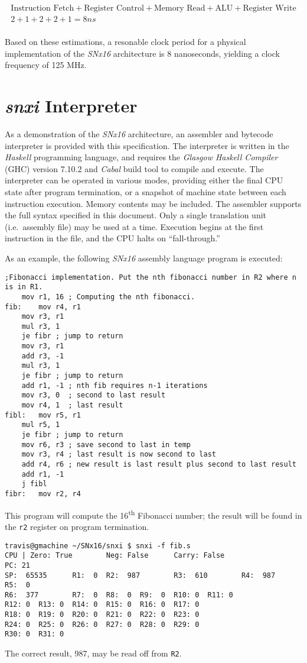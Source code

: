 \documentclass{article}
\begin{document}
\begin{gather*}
\text{Instruction Fetch} + \text{Register Control} + \text{Memory Read} + \text{ALU} + \text{Register Write} \\
2 + 1 + 2 + 2 + 1 = 8 ns \\
\end{gather*}

Based on these estimations, a resonable clock period for a physical
implementation of the \emph{SNx16} architecture is 8 nanoseconds, yielding a
clock frequency of 125 MHz.

\section{\emph{snxi} Interpreter}

As a demonstration of the \emph{SNx16} architecture, an assembler and bytecode
interpreter is provided with this specification. The interpreter is written in
the \emph{Haskell} programming language, and requires the
\emph{Glasgow Haskell Compiler} (GHC) version 7.10.2 and \emph{Cabal} build tool
to compile and execute. The interpreter can be operated in various modes,
providing either the final CPU state after program termination, or a snapshot of
machine state between each instruction execution. Memory contents may be
included. The assembler supports the full syntax specified in this document.
Only a single translation unit (i.e.\ assembly file) may be used at a time.
Execution begins at the first instruction in the file, and the CPU halts on
``fall-through.''

As an example, the following \emph{SNx16} assembly language program is executed:

\begin{lstlisting}
;Fibonacci implementation. Put the nth fibonacci number in R2 where n is in R1.
	mov r1, 16 ; Computing the nth fibonacci.
fib:	mov r4, r1
	mov r3, r1
	mul r3, 1
	je fibr ; jump to return
	mov r3, r1
	add r3, -1
	mul r3, 1
	je fibr ; jump to return
	add r1, -1 ; nth fib requires n-1 iterations
	mov r3, 0  ; second to last result
	mov r4, 1  ; last result
fibl:	mov r5, r1
	mul r5, 1
	je fibr ; jump to return
	mov r6, r3 ; save second to last in temp
	mov r3, r4 ; last result is now second to last
	add r4, r6 ; new result is last result plus second to last result
	add r1, -1
	j fibl
fibr:	mov r2, r4
\end{lstlisting}

This program will compute the 16\textsuperscript{th} Fibonacci number; the
result will be found in the \texttt{r2} register on program termination.

\begin{verbatim}
travis@gmachine ~/SNx16/snxi $ snxi -f fib.s
CPU | Zero: True        Neg: False      Carry: False
PC: 21
SP:  65535      R1:  0  R2:  987        R3:  610        R4:  987        R5:  0
R6:  377        R7:  0  R8:  0  R9:  0  R10: 0  R11: 0
R12: 0  R13: 0  R14: 0  R15: 0  R16: 0  R17: 0
R18: 0  R19: 0  R20: 0  R21: 0  R22: 0  R23: 0
R24: 0  R25: 0  R26: 0  R27: 0  R28: 0  R29: 0
R30: 0  R31: 0
\end{verbatim}

The correct result, 987, may be read off from \texttt{R2}.
\end{document}
